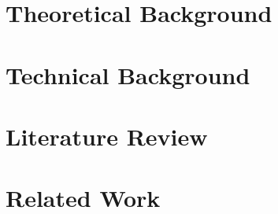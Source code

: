 \section{Theoretical Background}
\label{sec:theoreticalbackground}


\section{Technical Background}
\label{sec:technicalbackground}
%

\section{Literature Review}
\label{sec:literaturereview}
%

\section{Related Work}
\label{sec:relatedwork}
